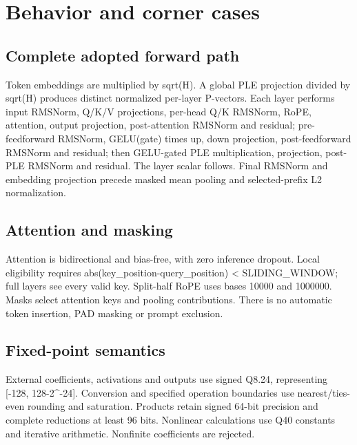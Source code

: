 \documentclass[11pt,a4paper]{article}
\begin{document}
\section{Behavior and corner cases}

\subsection{Complete adopted forward path}

Token embeddings are multiplied by sqrt(\allowbreak{}H)\allowbreak{}. A global PLE projection divided by sqrt(\allowbreak{}H)\allowbreak{} produces distinct normalized per-layer P-vectors. Each layer performs input RMSNorm,\allowbreak{} Q/\allowbreak{}K/\allowbreak{}V projections,\allowbreak{} per-head Q/\allowbreak{}K RMSNorm,\allowbreak{} RoPE,\allowbreak{} attention,\allowbreak{} output projection,\allowbreak{} post-attention RMSNorm and residual; pre-feedforward RMSNorm,\allowbreak{} GELU(\allowbreak{}gate)\allowbreak{} times up,\allowbreak{} down projection,\allowbreak{} post-feedforward RMSNorm and residual; then GELU-gated PLE multiplication,\allowbreak{} projection,\allowbreak{} post-PLE RMSNorm and residual. The layer scalar follows. Final RMSNorm and embedding projection precede masked mean pooling and selected-prefix L2 normalization.

\subsection{Attention and masking}

Attention is bidirectional and bias-free,\allowbreak{} with zero inference dropout. Local eligibility requires abs(\allowbreak{}key\_\allowbreak{}position-query\_\allowbreak{}position)\allowbreak{} < SLIDING\_\allowbreak{}WINDOW; full layers see every valid key. Split-half RoPE uses bases 10000 and 1000000. Masks select attention keys and pooling contributions. There is no automatic token insertion,\allowbreak{} PAD masking or prompt exclusion.

\subsection{Fixed-point semantics}

External coefficients,\allowbreak{} activations and outputs use signed Q8.24,\allowbreak{} representing [\allowbreak{}-128,\allowbreak{} 128-2\textasciicircum{}-24]\allowbreak{}. Conversion and specified operation boundaries use nearest/\allowbreak{}ties-even rounding and saturation. Products retain signed 64-bit precision and complete reductions at least 96 bits. Nonlinear calculations use Q40 constants and iterative arithmetic. Nonfinite coefficients are rejected.
\end{document}
